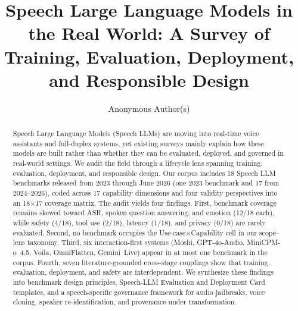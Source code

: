 \documentclass[a4paper,fleqn]{cas-sc}
\begin{document}
\let\WriteBookmarks\relax
\def\floatpagepagefraction{1}
\def\textpagefraction{.001}


\title[mode=title]{Speech Large Language Models in the Real World: A Survey of Training, Evaluation, Deployment, and Responsible Design}

\author{Anonymous Author(s)}
\begin{abstract}
Speech Large Language Models (Speech LLMs) are moving into real-time
voice assistants and full-duplex systems, yet existing surveys mainly
explain how these models are built rather than whether they can be
evaluated, deployed, and governed in real-world settings. We audit the
field through a lifecycle lens spanning training, evaluation,
deployment, and responsible design. Our corpus includes 18 Speech LLM
benchmarks released from 2023 through June 2026 (one 2023 benchmark
and 17 from 2024--2026), coded across 17 capability dimensions and
four validity perspectives into an 18$\times$17 coverage matrix. The
audit yields four findings. First, benchmark coverage remains skewed
toward ASR, spoken question answering, and emotion (12/18 each),
while safety (4/18), tool use (2/18), latency (1/18), and privacy
(0/18) are rarely evaluated. Second, no benchmark occupies the
Use-case$\times$Capability cell in our scope--lens taxonomy. Third,
six interaction-first systems (Moshi, GPT-4o-Audio, MiniCPM-o~4.5,
Voila, OmniFlatten, Gemini~Live) appear in at most one benchmark in
the corpus. Fourth, seven literature-grounded cross-stage couplings
show that training, evaluation, deployment, and safety are
interdependent. We synthesize these findings into benchmark design
principles, Speech-LLM Evaluation and Deployment Card templates, and
a speech-specific governance framework for audio jailbreaks, voice
cloning, speaker re-identification, and provenance under
transformation.
\end{abstract}
\end{document}
